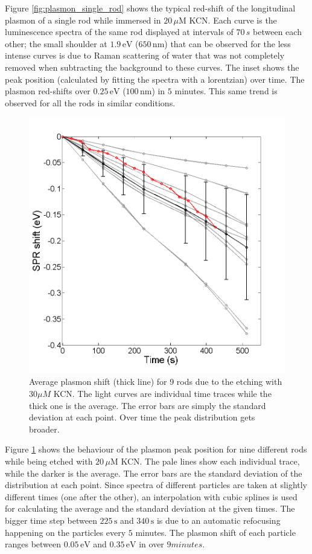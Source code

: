 \documentclass{article}
\begin{document}
Figure \ref{fig:plasmon_single_rod} shows the typical red-shift of the
longitudinal plasmon of a single rod while immersed in $20\,\mu\textrm{M}$ KCN.
Each curve is the luminescence spectra of the same rod displayed at intervals of
$70\,s$ between each other; the small shoulder at $1.9\,\textrm{eV}$
($650\,\textrm{nm}$) that can be observed for the less intense curves is due to
Raman scattering of water that was not completely removed when subtracting the
background to these curves. The inset shows the peak position (calculated by
fitting the spectra with a lorentzian) over time. The plasmon red-shifts over
$0.25\,\textrm{eV}$ ($100\,\textrm{nm}$) in $5$ minutes. This same trend is
observed for all the rods in similar conditions.

\begin{figure}[p]
 \centering
 \includegraphics[width=0.95\linewidth]{plasmon_average.png}
 \caption{Average plasmon shift (thick line) for 9 rods due to the etching with
 $30\mu M$ KCN. The light curves are individual time traces while the thick one
 is the average. The error bars are simply the standard deviation at each point. Over
 time the peak distribution gets broader.}
 \label{fig:plasmon_average}
\end{figure}

Figure \ref{fig:plasmon_average} shows the behaviour of the plasmon peak
position for nine different rods while being etched with $20\,\mu\textrm{M}$
KCN. The pale lines show each individual trace, while the darker is the average.
The error bars are the standard deviation of the distribution at each point.
Since spectra of different particles are taken at slightly different times (one
after the other), an interpolation with cubic splines is used for calculating
the average and the standard deviation at the given times. The bigger time step
between $225\,\textrm{s}$ and $340\,\textrm{s}$ is due to an automatic
refocusing happening on the particles every $5$ minutes. The plasmon shift of
each particle ranges between $0.05\,\textrm{eV}$ and $0.35\,\textrm{eV}$ in over
$9 minutes$. 
\end{document}
